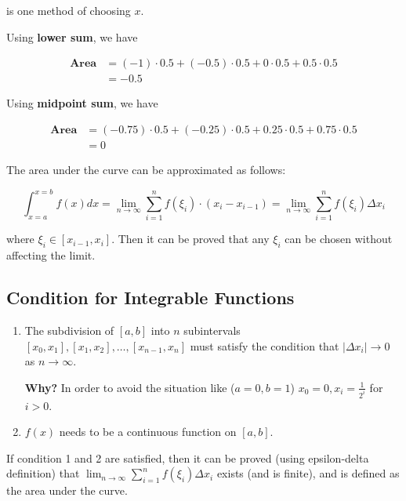is one method of choosing $x$.

Using \textbf{lower sum}, we have

\begin{equation*}
\begin{split}
    \textbf{Area}
    &= (-1) \cdot 0.5 + (-0.5) \cdot 0.5 + 0 \cdot 0.5 + 0.5 \cdot 0.5\\
    &= -0.5
\end{split}
\end{equation*}

Using \textbf{midpoint sum}, we have

\begin{equation*}
\begin{split}
    \textbf{Area}
    &= (-0.75) \cdot 0.5 + (-0.25) \cdot 0.5 + 0.25 \cdot 0.5 + 0.75 \cdot 0.5\\
    &= 0
\end{split}
\end{equation*}

The area under the curve can be approximated as follows:

$$ \int_{x=a}^{x=b} f(x) dx = \lim_{n\to\infty} \sum_{i=1}^n f(\xi_i) \cdot (x_i - x_{i-1}) = \lim_{n\to\infty} \sum_{i=1}^n f(\xi_i) \Delta x_i $$

where $\xi_i \in [x_{i-1}, x_i]$. Then it can be proved that any $\xi_i$ can be chosen without affecting the limit.

\subsection{Condition for Integrable Functions}

\begin{enumerate}
    \item The subdivision of $[a, b]$ into $n$ subintervals $[x_0, x_1], [x_1, x_2], \dots, [x_{n-1}, x_n]$ must satisfy the condition that $|\Delta x_i| \to 0$ as $n \to \infty$.
    
    \textbf{Why?} In order to avoid the situation like ($a = 0, b = 1$) $x_0 = 0, x_i = \frac{1}{2^i}$ for $i > 0$.
    
    \item $f(x)$ needs to be a continuous function on $[a, b]$.
\end{enumerate}

If condition 1 and 2 are satisfied, then it can be proved (using epsilon-delta definition) that $\lim_{n\to\infty} \sum_{i=1}^n f(\xi_i) \Delta x_i$ exists (and is finite), and is defined as the area under the curve.


